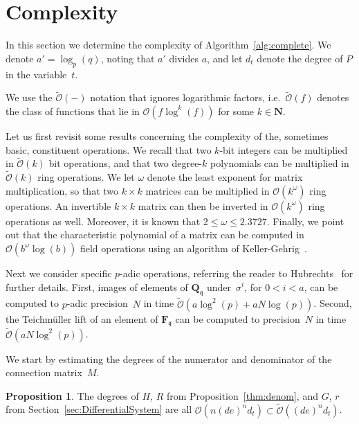 \documentclass[a4paper,11pt]{article}
\numberwithin{equation}{section}
\newcommand{\NN}{\mathbf{N}} %
\newcommand{\QQ}{\mathbf{Q}} %
\newcommand{\FF}{\mathbf{F}} %
\providecommand{\BigOh}{\mathcal{O}}          %
\providecommand{\SoftOh}{\tilde{\mathcal{O}}} %
\theoremstyle{definition}
\newtheorem{prop}[thm]{Proposition}
\begin{document}

\section{Complexity}

\label{sec:Complexity}

In this section we determine the complexity of Algorithm~\ref{alg:complete}.
We denote $a' = \log_p(q)$, noting that $a'$ divides $a$, 
and let $d_t$ denote the degree of $P$ in the variable~$t$. 

We use the $\SoftOh(-)$ notation that ignores logarithmic factors, 
i.e.\ $\SoftOh(f)$ denotes the class of functions 
that lie in $\BigOh(f \log^k(f))$ for some $k \in \NN$.

Let us first revisit some results concerning the complexity of the, 
sometimes basic, constituent operations.  We recall that two $k$-bit 
integers can be multiplied in $\SoftOh(k)$ bit operations, and that 
two degree-$k$ polynomials can be multiplied in $\SoftOh(k)$ ring 
operations.  We let $\omega$ denote the least exponent for matrix 
multiplication, so that two $k \times k$ matrices can be multiplied 
in $\BigOh(k^{\omega})$ ring operations. An invertible $k \times k$ matrix 
can then be inverted in $\BigOh(k^{\omega})$ ring operations as well. 
Moreover, it is known that $2 \leq \omega \leq 2.3727$.  Finally, we 
point out that the characteristic polynomial of a matrix can be 
computed in $\BigOh(b^{\omega} \log(b))$ field operations using 
an algorithm of Keller-Gehrig~\citep{KellerGehrig1985}.

Next we consider specific $p$-adic operations, referring the reader to 
Hubrechts~\citep{Hubrechts2010} for further details.  First, images of elements 
of $\QQ_{\mathfrak{q}}$ under~$\sigma^i$, for $0 < i < a$, can be computed to 
$p$-adic precision~$N$ in time $\SoftOh(a \log^2(p) + a N \log(p))$.  Second, 
the Teichm\"uller lift of an element of $\FF_{\mathfrak{q}}$ can be computed 
to precision~$N$ in time $\SoftOh(a N \log^2(p))$.

We start by estimating the degrees of the numerator and denominator of the
connection matrix~$M$.

\begin{prop}
The degrees of $H$, $R$ from Proposition~\ref{thm:denom}, and
$G$, $r$ from Section~\ref{sec:DifferentialSystem} are all
$\BigOh(n(de)^n d_t) \subset \SoftOh((de)^n d_t)$.
\end{prop}
\end{document}
